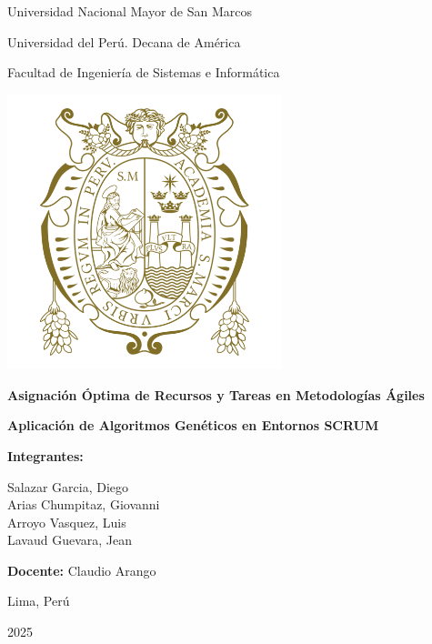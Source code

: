 \begin{titlepage}
    \centering
    {\LARGE Universidad Nacional Mayor de San Marcos \par}
    {\large Universidad del Perú. Decana de América\par}
    \vspace{0.5cm}
    {\Large Facultad de Ingeniería de Sistemas e Informática\par}
    \vspace{0.5cm}

    \includegraphics[width=8cm]{imagenes/logo-unmsm.png}\par
    \vspace{0.5cm}

    {\LARGE\bfseries Asignación Óptima de Recursos y Tareas en Metodologías Ágiles\par}
    \vspace{0.5cm}
    {\large\bfseries Aplicación de Algoritmos Genéticos en Entornos SCRUM\par}
    \vspace{1cm}

    {\Large\bfseries Integrantes:\par}
    \vspace{0.5cm}
    Salazar Garcia, Diego\\[4pt]
    Arias Chumpitaz, Giovanni\\[4pt]
    Arroyo Vasquez, Luis\\[4pt]
    Lavaud Guevara, Jean\\[4pt]
    \vspace{1cm}

    {\large \textbf{Docente:} Claudio Arango\par}
    \vfill

    {\large Lima, Perú\par}
    {\large 2025\par}
\end{titlepage}

